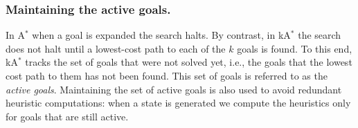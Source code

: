 \documentclass{aicom2e}
\newcommand{\astar}{A$^*$}
\newcommand{\kastar}{kA$^*$}
\newcommand{\open}{\textsc{Open}}
\begin{document}

\subsubsection*{Maintaining the active goals.}

In \astar{} when a goal is expanded the search halts. By contrast, in \kastar{}
the search does not halt until a lowest-cost path to each of the $k$ goals is
found. To this end, \kastar{} tracks the set of goals that were not solved
yet, i.e., the goals that the lowest cost path to them has not been found.
This set of goals is referred to as the {\em active goals}. Maintaining the
set of active goals is also used to avoid redundant heuristic computations:
when a state is generated we  compute the heuristics only for goals that are
still active.



\end{document}
